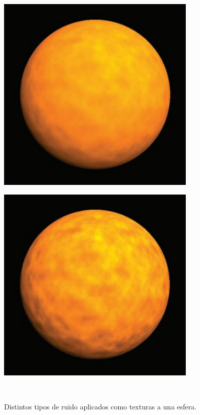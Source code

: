 \begin{figure}[H]
\centering
    \hspace{-4mm}
    \begin{minipage}{0.5\textwidth}
        \centering
        \includegraphics[scale=0.5]{Images/Shaders/luna1.jpg}\\
    \end{minipage}
    \begin{minipage}{0.5\textwidth}
        \centering
        \includegraphics[scale=0.5]{Images/Shaders/luna2.jpg}\\
    \end{minipage}\\
    \caption[Distintos tipos de ruido aplicados como texturas a una esfera]{Distintos tipos de ruido aplicados como texturas a una esfera\footnotemark.}
    \label{fig:shadernoise}
\end{figure}


